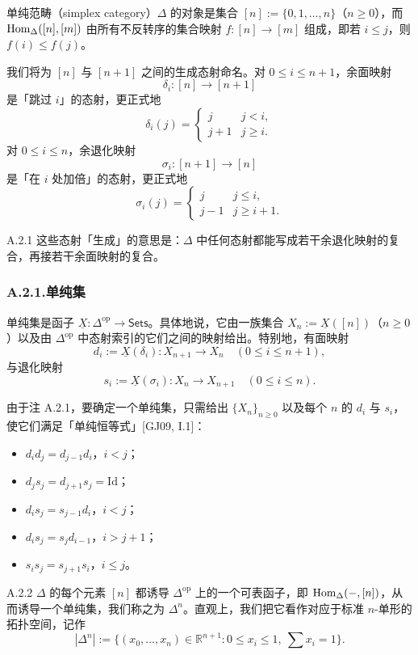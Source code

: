 单纯范畴（simplex category）$\Delta$ 的对象是集合 $[n]:=\{0,1,\dots,n\}$（$n\ge0$），而 $\operatorname{Hom}_\Delta([n],[m])$ 由所有不反转序的集合映射 $f\colon[n]\to[m]$ 组成，即若 $i\le j$，则 $f(i)\le f(j)$。

我们将为 $[n]$ 与 $[n+1]$ 之间的生成态射命名。对 $0\le i\le n+1$，余面映射
\[
\delta_i\colon[n]\to[n+1]
\]
是「跳过 $i$」的态射，更正式地
\[
\delta_i(j)=\begin{cases}j & j<i,\\ j+1 & j\ge i.\end{cases}
\]
对 $0\le i\le n$，余退化映射
\[
\sigma_i\colon[n+1]\to[n]
\]
是「在 $i$ 处加倍」的态射，更正式地
\[
\sigma_i(j)=\begin{cases}j & j\le i,\\ j-1 & j\ge i+1.\end{cases}
\]

\begin{rem}{A.2.1}\label{thm:a6-06-12}
这些态射「生成」的意思是：$\Delta$ 中任何态射都能写成若干余退化映射的复合，再接若干余面映射的复合。
\end{rem}

\subsubsection*{A.2.1.\quad 单纯集}

单纯集是函子 $\underline X\colon\Delta^{\mathrm{op}}\to\mathsf{Sets}$。具体地说，它由一族集合 $X_n:=\underline X([n])$（$n\ge0$）以及由 $\Delta^{\mathrm{op}}$ 中态射索引的它们之间的映射给出。特别地，有面映射
\[
d_i:=\underline X(\delta_i)\colon X_{n+1}\to X_n\quad(0\le i\le n+1),
\]
与退化映射
\[
s_i:=\underline X(\sigma_i)\colon X_n\to X_{n+1}\quad(0\le i\le n).
\]

由于注 A.2.1，要确定一个单纯集，只需给出 $\{X_n\}_{n\ge0}$ 以及每个 $n$ 的 $d_i$ 与 $s_i$，使它们满足「单纯恒等式」[GJ09, I.1]：
\begin{itemize}
\item $d_id_j=d_{j-1}d_i$，$i<j$；
\item $d_js_j=d_{j+1}s_j=\mathrm{Id}$；
\item $d_is_j=s_{j-1}d_i$，$i<j$；
\item $d_is_j=s_jd_{i-1}$，$i>j+1$；
\item $s_is_j=s_{j+1}s_i$，$i\le j$。
\end{itemize}

\begin{exam}{A.2.2}\label{thm:a6-06-13}
$\Delta$ 的每个元素 $[n]$ 都诱导 $\Delta^{\mathrm{op}}$ 上的一个可表函子，即 $\operatorname{Hom}_\Delta(-,[n])$，从而诱导一个单纯集，我们称之为 $\Delta^n$。直观上，我们把它看作对应于标准 $n$-单形的拓扑空间，记作
\[
|\Delta^n|:=\{(x_0,\dots,x_n)\in\mathbb R^{n+1}\colon0\le x_i\le1,\ \textstyle\sum x_i=1\}.
\]
\end{exam}


